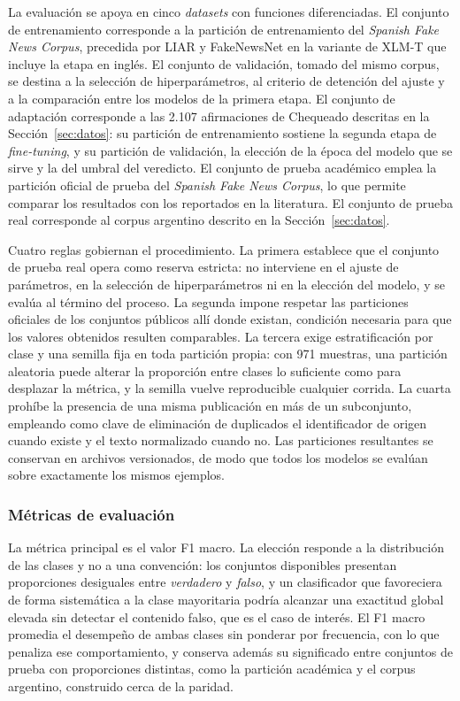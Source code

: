 La evaluación se apoya en cinco \textit{datasets} con funciones diferenciadas. El conjunto de entrenamiento corresponde a la partición de entrenamiento del \textit{Spanish Fake News Corpus}, precedida por LIAR y FakeNewsNet en la variante de XLM-T que incluye la etapa en inglés. El conjunto de validación, tomado del mismo corpus, se destina a la selección de hiperparámetros, al criterio de detención del ajuste y a la comparación entre los modelos de la primera etapa. El conjunto de adaptación corresponde a las 2.107 afirmaciones de Chequeado descritas en la Sección~\ref{sec:datos}: su partición de entrenamiento sostiene la segunda etapa de \textit{fine-tuning}, y su partición de validación, la elección de la época del modelo que se sirve y la del umbral del veredicto. El conjunto de prueba académico emplea la partición oficial de prueba del \textit{Spanish Fake News Corpus}, lo que permite comparar los resultados con los reportados en la literatura. El conjunto de prueba real corresponde al corpus argentino descrito en la Sección~\ref{sec:datos}.

Cuatro reglas gobiernan el procedimiento. La primera establece que el conjunto de prueba real opera como reserva estricta: no interviene en el ajuste de parámetros, en la selección de hiperparámetros ni en la elección del modelo, y se evalúa al término del proceso. La segunda impone respetar las particiones oficiales de los conjuntos públicos allí donde existan, condición necesaria para que los valores obtenidos resulten comparables. La tercera exige estratificación por clase y una semilla fija en toda partición propia: con 971 muestras, una partición aleatoria puede alterar la proporción entre clases lo suficiente como para desplazar la métrica, y la semilla vuelve reproducible cualquier corrida. La cuarta prohíbe la presencia de una misma publicación en más de un subconjunto, empleando como clave de eliminación de duplicados el identificador de origen cuando existe y el texto normalizado cuando no. Las particiones resultantes se conservan en archivos versionados, de modo que todos los modelos se evalúan sobre exactamente los mismos ejemplos.

\subsubsection{Métricas de evaluación}

La métrica principal es el valor F1 macro. La elección responde a la distribución de las clases y no a una convención: los conjuntos disponibles presentan proporciones desiguales entre \textit{verdadero} y \textit{falso}, y un clasificador que favoreciera de forma sistemática a la clase mayoritaria podría alcanzar una exactitud global elevada sin detectar el contenido falso, que es el caso de interés. El F1 macro promedia el desempeño de ambas clases sin ponderar por frecuencia, con lo que penaliza ese comportamiento, y conserva además su significado entre conjuntos de prueba con proporciones distintas, como la partición académica y el corpus argentino, construido cerca de la paridad.


